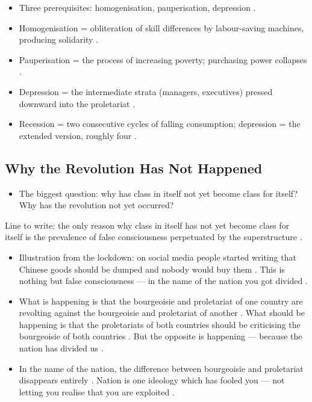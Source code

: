 \begin{QuickRevision}
\begin{itemize}
    \item Three prerequisites: homogenisation, pauperisation, depression .
    \item Homogenisation = obliteration of skill differences by labour-saving machines, producing solidarity .
    \item Pauperisation = the process of increasing poverty; purchasing power collapses .
    \item Depression = the intermediate strata (managers, executives) pressed downward into the proletariat .
    \item Recession = two consecutive cycles of falling consumption; depression = the extended version, roughly four .
\end{itemize}
\end{QuickRevision}

\subsection{Why the Revolution Has Not Happened}
\begin{itemize}
    \item The biggest question: why has class in itself not yet become class for itself? Why has the revolution not yet occurred? 
\end{itemize}

\begin{KeyConcept}
Line to write: the only reason why class in itself has not yet become class for itself is the prevalence of false consciousness perpetuated by the superstructure .
\end{KeyConcept}

\begin{itemize}
    \item Illustration from the lockdown: on social media people started writing that Chinese goods should be dumped and nobody would buy them . This is nothing but false consciousness --- in the name of the nation you got divided .
    \item What is happening is that the bourgeoisie and proletariat of one country are revolting against the bourgeoisie and proletariat of another . What should be happening is that the proletariats of both countries should be criticising the bourgeoisie of both countries . But the opposite is happening --- because the nation has divided us .
    \item In the name of the nation, the difference between bourgeoisie and proletariat disappears entirely . Nation is one ideology which has fooled you --- not letting you realise that you are exploited .
\end{itemize}

